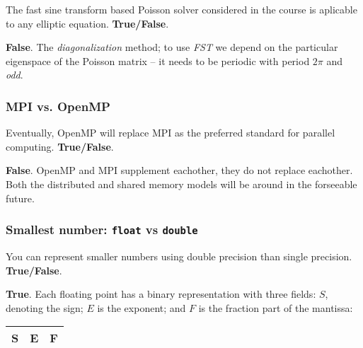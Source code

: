 \begin{question}
  The fast sine transform based Poisson solver considered in the course is aplicable to any elliptic equation. \textbf{True/False}.
\end{question}

\textbf{False}. The \emph{diagonalization} method; to use \emph{FST} we depend on the particular eigenspace of the Poisson matrix -- it needs to be periodic with period $2\pi$ and \emph{odd}.

\subsubsection{MPI vs. OpenMP} %
\label{ssub:mpi_vs_openmp}

\begin{question}
  Eventually, OpenMP will replace MPI as the preferred standard for parallel computing. \textbf{True/False}.
\end{question}

\textbf{False}. OpenMP and MPI supplement eachother, they do not replace eachother. Both the distributed and shared memory models will be around in the forseeable future.

\subsubsection{Smallest number: \texttt{float} vs \texttt{double}} %
\label{ssub:smallest_number_tt}
\begin{question}
  You can represent smaller numbers using double precision than single precision. \textbf{True/False}.
\end{question}

\textbf{True}. Each floating point has a binary representation with three fields: $S$, denoting the sign; $E$ is the exponent; and $F$ is the fraction part of the mantissa:

\vspace{1em}

\begin{center}
  \begin{tabular}{|c|c|c|}
    \hline
    S & \hspace{4em} E \hspace{4em} & \hspace{8em} F \hspace{8em} \\
    \hline
  \end{tabular}
\end{center}

